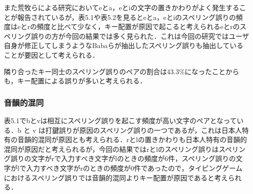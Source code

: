 また荒牧らによる研究\cite{aramakiNLP2010}においてeとa，eとiの文字の置きかわりがよく発生することが報告されているが，表5.1や表5.2を見るとeとa，eとiのスペリング誤りの頻度はeとrの頻度と比べて少なく，キー配置が原因で起こると考えられるeとrのスペリング誤りの方が今回の結果では多く見られた．これは今回の研究ではユーザ自身が修正してしまうようなBabaらが抽出したスペリング誤り\cite{babaACL2012}も抽出していることが要因として考えられる．

\begin{comment}
表5.1においてのスペリング誤りの文字と入力すべき文字をスペリング誤りのペアとして抽出し，その中で
\end{comment}
隣り合ったキー同士のスペリング誤りのペアの割合は43.3\%になったことからも，キー配置による誤りが多いと考えられる．

\begin{comment}
\subsubsection{視覚的混同}
文字同士の形が似ていることから視覚的混同を起こすことが原因であると考えられるスペリング誤りを示す．文字同士の形態的類似度は荒牧ら\cite{aramakiNLP2010}が用いた式に基づいて算出した．式は文字をMSゴシックのフォントで表し，2つの文字の面積の和を分母，2つの文字のフォントを重ね合わせたとき，重なり合った部分の面積の2倍の値を分子としている．式は以下に示す．

\[
  \mbox{文字の類似度} = \frac{\mbox{文字同士の重なり合う部分の面積} \times 2}{\mbox{2つの文字の面積の和}}
\]

表5.3にこの式を用いて求めたsやoと他の文字との類似度を示す．表5.1をみるとsがスペリング誤りになるときの入力すべき文字はcであり，これらの文字は表5.3で示される文字の類似度においても高い値を示している．また表5.3にはpとoについての類似度も示しており，pとoの類似度が互いに高い類似度の値を示している．このことからcとs，pとoのスペリング誤りにおいて視覚的混同が理由の一つになると考えられる．

表5.1においてのスペリング誤りの文字と入力すべき文字をスペリング誤りのペアとして抽出し，その中で表5.3の類似度が0.75以上となるスペリング誤りを抽出したところ，その割合は18.2\%となった．
\end{comment}

\subsubsection{音韻的混同}
表5.1でbとvは相互にスペリング誤りを起こす頻度が高い文字のペアとなっている．b と v は打鍵誤りが原因のスペリング誤りの一つであるが，これは日本人特有の音韻的混同が原因とも考えられる．rとlの置きかわりも日本人特有の音韻的混同が原因だと考えられるが，今回の結果ではrとlのスペリング誤りはスペリング誤りの文字がrで入力すべき文字がlのときの頻度が6件，スペリング誤りの文字がlで入力すべき文字がrのときの頻度が0件であったので，タイピングゲームにおけるスペリング誤りでは音韻的混同よりキー配置が原因であると考えられる．

